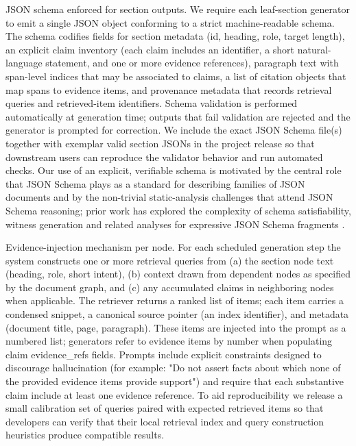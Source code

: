 JSON schema enforced for section outputs.
We require each leaf-section generator to emit a single JSON object conforming to a strict machine-readable schema. The schema codifies fields for section metadata (id, heading, role, target length), an explicit claim inventory (each claim includes an identifier, a short natural-language statement, and one or more evidence references), paragraph text with span-level indices that may be associated to claims, a list of citation objects that map spans to evidence items, and provenance metadata that records retrieval queries and retrieved-item identifiers. Schema validation is performed automatically at generation time; outputs that fail validation are rejected and the generator is prompted for correction. We include the exact JSON Schema file(s) together with exemplar valid section JSONs in the project release so that downstream users can reproduce the validator behavior and run automated checks. Our use of an explicit, verifiable schema is motivated by the central role that JSON Schema plays as a standard for describing families of JSON documents and by the non-trivial static-analysis challenges that attend JSON Schema reasoning; prior work has explored the complexity of schema satisfiability, witness generation and related analyses for expressive JSON Schema fragments \cite{web_attouche_2022_witness_generation_for_json_schema,web_baazizi_2021_not_elimination_and_witness_generation_for_json_}.

Evidence-injection mechanism per node.
For each scheduled generation step the system constructs one or more retrieval queries from (a) the section node text (heading, role, short intent), (b) context drawn from dependent nodes as specified by the document graph, and (c) any accumulated claims in neighboring nodes when applicable. The retriever returns a ranked list of items; each item carries a condensed snippet, a canonical source pointer (an index identifier), and metadata (document title, page, paragraph). These items are injected into the prompt as a numbered list; generators refer to evidence items by number when populating claim evidence_refs fields. Prompts include explicit constraints designed to discourage hallucination (for example: "Do not assert facts about which none of the provided evidence items provide support") and require that each substantive claim include at least one evidence reference. To aid reproducibility we release a small calibration set of queries paired with expected retrieved items so that developers can verify that their local retrieval index and query construction heuristics produce compatible results.

